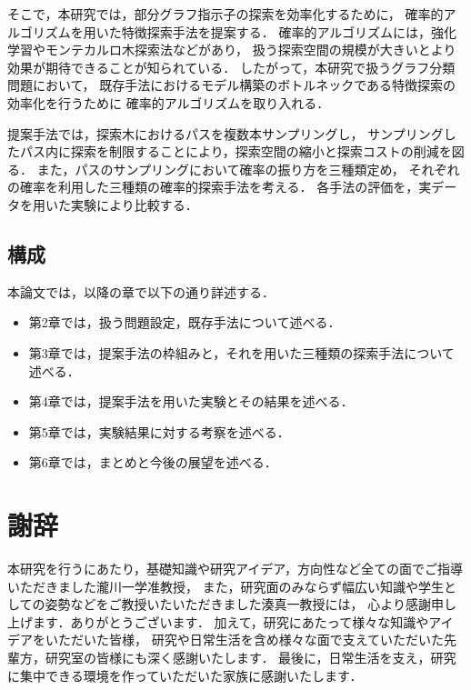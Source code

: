 \documentclass[12pt,fleqn]{jsotsuron}
\begin{document}
そこで，本研究では，部分グラフ指示子の探索を効率化するために，
確率的アルゴリズムを用いた特徴探索手法を提案する．
確率的アルゴリズムには，強化学習やモンテカルロ木探索法\cite{MCTS}などがあり，
扱う探索空間の規模が大きいとより効果が期待できることが知られている．
したがって，本研究で扱うグラフ分類問題において，
既存手法におけるモデル構築のボトルネックである特徴探索の効率化を行うために
確率的アルゴリズムを取り入れる．

提案手法では，探索木におけるパスを複数本サンプリングし，
サンプリングしたパス内に探索を制限することにより，探索空間の縮小と探索コストの削減を図る．
また，パスのサンプリングにおいて確率の振り方を三種類定め，
それぞれの確率を利用した三種類の確率的探索手法を考える．
各手法の評価を，実データを用いた実験により比較する．

\section{構成}
本論文では，以降の章で以下の通り詳述する．
\begin{itemize}
\item 第2章では，扱う問題設定，既存手法について述べる．
\item 第3章では，提案手法の枠組みと，それを用いた三種類の探索手法について述べる．
\item 第4章では，提案手法を用いた実験とその結果を述べる．
\item 第5章では，実験結果に対する考察を述べる．
\item 第6章では，まとめと今後の展望を述べる．
\end{itemize}




\chapter*{謝辞}
本研究を行うにあたり，基礎知識や研究アイデア，方向性など全ての面でご指導いただきました瀧川一学准教授，
また，研究面のみならず幅広い知識や学生としての姿勢などをご教授いたいただきました湊真一教授には，
心より感謝申し上げます．ありがとうございます．
加えて，研究にあたって様々な知識やアイデアをいただいた皆様，
研究や日常生活を含め様々な面で支えていただいた先輩方，研究室の皆様にも深く感謝いたします．
最後に，日常生活を支え，研究に集中できる環境を作っていただいた家族に感謝いたします．


\end{document}

